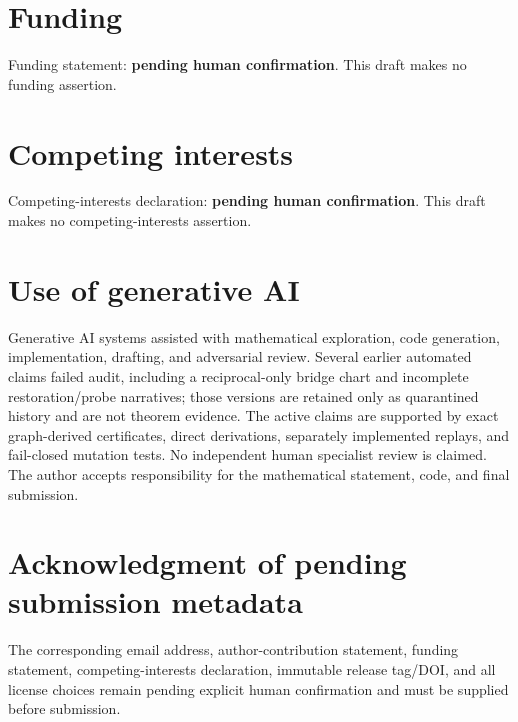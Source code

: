 \documentclass[11pt]{article}
\theoremstyle{remark}
\newcommand{\1}{\mathbf 1}
\begin{document}
\section*{Funding}

Funding statement: \textbf{pending human confirmation}.  This draft makes no
funding assertion.

\section*{Competing interests}

Competing-interests declaration: \textbf{pending human confirmation}.  This
draft makes no competing-interests assertion.

\section*{Use of generative AI}

Generative AI systems assisted with mathematical exploration, code generation,
implementation, drafting, and adversarial review.  Several earlier automated
claims failed audit, including a reciprocal-only bridge chart and incomplete
restoration/probe narratives; those versions are retained only as quarantined
history and are not theorem evidence.  The active claims are supported by
exact graph-derived certificates, direct derivations, separately implemented
replays, and fail-closed mutation tests.  No independent human specialist
review is claimed.  The author accepts responsibility for the mathematical
statement, code, and final submission.

\section*{Acknowledgment of pending submission metadata}

The corresponding email address, author-contribution statement, funding
statement, competing-interests declaration, immutable release tag/DOI, and all
license choices remain pending explicit human confirmation and must be
supplied before submission.

{\small


}
\end{document}
